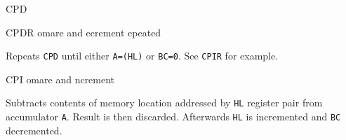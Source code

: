 \begin{basedescript}{
    \desclabelstyle{\multilinelabel}
    \desclabelwidth{3cm}}
\begin{DetailItem}{CPD}
        \begin{DetailTiming}
        \end{DetailTiming}

    \end{DetailItem}

    \begin{DetailItem}{CPDR}
        {omare and ecrement epeated}
        {\SymCPDR}

        Repeats {\tt CPD} until either {\tt A=(HL)} or {\tt BC=0}. See {\tt CPIR} for example.

        \begin{DetailEffects}
            \FlagsCPDR
        \end{DetailEffects}
				
        \begin{DetailTiming}
        \end{DetailTiming}

    \end{DetailItem}

    \pagebreak
    \begin{DetailItem}{CPI}
        {omare and ncrement}
        {\SymCPI}

        Subtracts contents of memory location addressed by {\tt HL} register pair from accumulator {\tt A}. Result is then discarded. Afterwards {\tt HL} is incremented and {\tt BC} decremented.

        \begin{DetailEffects}
            \FlagsCPI
        \end{DetailEffects}
		
        \begin{DetailTiming}
        \end{DetailTiming}


\end{DetailItem}
\end{basedescript}
